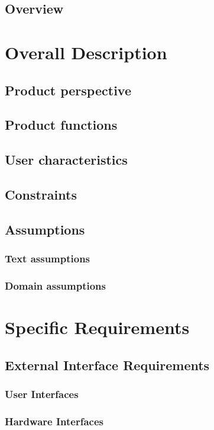 \documentclass[11pt,a4paper]{report}
\begin{document}
\section{Overview}
\chapter{Overall Description}
\section{Product perspective}
\section{Product functions}
\section{User characteristics}
\section{Constraints}
\section{Assumptions}
\subsection{Text assumptions}
\subsection{Domain assumptions}
\chapter{Specific Requirements}
\section{External Interface Requirements}
\subsection{User Interfaces}
\subsection{Hardware Interfaces}
\end{document}
